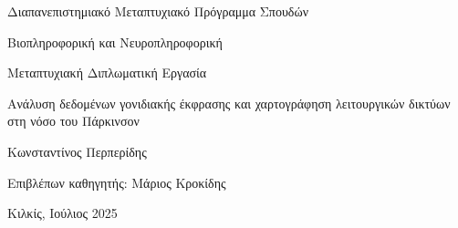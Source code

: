 \documentclass[12pt]{article}
\begin{document}
    \begin{titlepage}
        \begin{center}
            \Large{Διαπανεπιστημιακό Μεταπτυχιακό Πρόγραμμα Σπουδών}
        \end{center}
        \begin{center}
            \Large{Βιοπληροφορική και Νευροπληροφορική}
        \end{center}
        \vspace{16mm}
        \begin{center}
            \Large{Μεταπτυχιακή Διπλωματική Εργασία}
        \end{center}
        \begin{center}
            \Large{Ανάλυση δεδομένων γονιδιακής έκφρασης και χαρτογράφηση λειτουργικών δικτύων στη νόσο του Πάρκινσον}
        \end{center}
        \vspace{16mm}
        \begin{center}
            Κωνσταντίνος Περπερίδης
        \end{center}
        \vspace{16mm}
        \begin{center}
            Επιβλέπων καθηγητής: Μάριος Κροκίδης
        \end{center}
        \vspace{50mm}
        \begin{center}
            Κιλκίς, Ιούλιος 2025
        \end{center}
    \end{titlepage}
\end{document}
